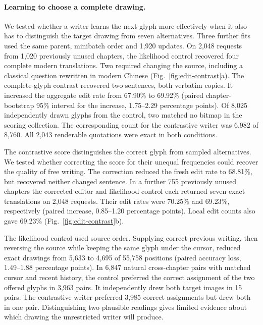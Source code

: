 \paragraph{Learning to choose a complete drawing.}
We tested whether a writer learns the next glyph more effectively when it also has to distinguish the target drawing from seven alternatives. Three further fits used the same parent, minibatch order and 1,920 updates. On 2,048 requests from 1,020 previously unused chapters, the likelihood control recovered four complete modern translations. Two required changing the source, including a classical question rewritten in modern Chinese (Fig.~\ref{fig:edit-contrast}a). The complete-glyph contrast recovered two sentences, both verbatim copies. It increased the aggregate edit rate from 67.90\% to 69.92\% (paired chapter-bootstrap 95\% interval for the increase, 1.75--2.29 percentage points). Of 8,025 independently drawn glyphs from the control, two matched no bitmap in the scoring collection. The corresponding count for the contrastive writer was 6,982 of 8,760. All 2,043 renderable quotations were exact in both conditions.

The contrastive score distinguishes the correct glyph from sampled alternatives. We tested whether correcting the score for their unequal frequencies could recover the quality of free writing. The correction reduced the fresh edit rate to 68.81\%, but recovered neither changed sentence. In a further 755 previously unused chapters the corrected editor and likelihood control each returned seven exact translations on 2,048 requests. Their edit rates were 70.25\% and 69.23\%, respectively (paired increase, 0.85--1.20 percentage points). Local edit counts also gave 69.23\% (Fig.~\ref{fig:edit-contrast}b).

The likelihood control used source order. Supplying correct previous writing, then reversing the source while keeping the same glyph under the cursor, reduced exact drawings from 5,633 to 4,695 of 55,758 positions (paired accuracy loss, 1.49--1.88 percentage points). In 6,847 natural cross-chapter pairs with matched cursor and recent history, the control preferred the correct assignment of the two offered glyphs in 3,963 pairs. It independently drew both target images in 15 pairs. The contrastive writer preferred 3,985 correct assignments but drew both in one pair. Distinguishing two plausible readings gives limited evidence about which drawing the unrestricted writer will produce.
